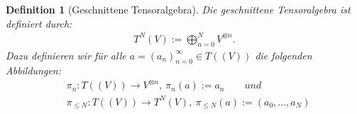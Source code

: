 \documentclass[12pt,titlepage,headsepline]{article}
\newtheorem{definition}{Definition}[section]
\begin{document}
      \begin{definition}[Geschnittene Tensoralgebra]
        Die \textit{geschnittene Tensoralgebra} ist definiert durch:
        \begin{align*}
          T^N(V) := \bigoplus^{N}_{n=0}V^{\otimes n}.
        \end{align*}
        Dazu definieren wir für alle $a=(a_n)^{\infty}_{n=0} \in T((V))$ die folgenden Abbildungen:
        \begin{align*}
          & \pi_n: T((V)) \rightarrow V^{\otimes n}, \ \pi_n(a):=a_n
          \qquad und \\
          & \pi_{\leq N}: T((V)) \rightarrow T^N(V), \ \pi_{\leq N}(a):=(a_0,\ldots,a_N)
        \end{align*}
      \end{definition}
\end{document}

